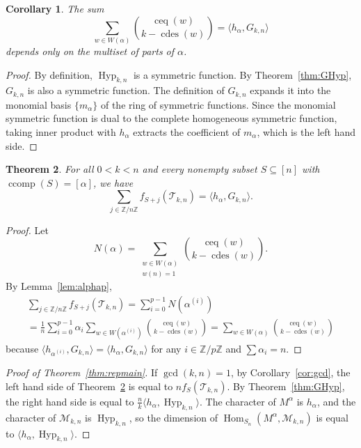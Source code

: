 \documentclass[10pt,a4paper]{amsart}
\theoremstyle{plain}
\newtheorem{theorem}{Theorem}[section]
\newtheorem{corollary}[theorem]{Corollary}
\theoremstyle{definition}
\newcommand{\Z}{\mathbb{Z}}
\newcommand{\Tri}{\mathcal{T}_{k,n}}
\DeclareMathOperator{\ccomp}{ccomp}
\DeclareMathOperator{\Hyp}{Hyp}
\DeclareMathOperator{\Hom}{Hom}
\DeclareMathOperator{\cdes}{cdes}
\DeclareMathOperator{\ceq}{ceq}
\begin{document}
\begin{corollary}\label{cor:Gsym}
	The sum
	\[
		\sum_{w \in W(\alpha)} \binom{\ceq(w)}{k - \cdes(w)} = \langle h_\alpha, G_{k,n} \rangle
	\]
	depends only on the multiset of parts of $ \alpha $.
\end{corollary}
\begin{proof}
	By definition, $\Hyp_{k,n}$ is a symmetric function. By Theorem~\ref{thm:GHyp}, $G_{k,n}$ is also a symmetric function. The definition of $G_{k,n}$ expands it into the monomial basis $\{m_\alpha\}$ of the ring of symmetric functions. Since the monomial symmetric function is dual to the complete homogeneous symmetric function, taking inner product with $h_\alpha$ extracts the coefficient of $m_\alpha$, which is the left hand side.
\end{proof}

\begin{theorem}\label{thm:ftoG}
	For all $ 0 < k < n $
	and every nonempty subset $ S \subseteq [n] $ with $
		\ccomp(S) = [\alpha]$, we have
	\begin{equation}
		\sum_{j \in \Z/n\Z} f_{S+j}(\Tri) = \langle h_\alpha, G_{k,n} \rangle.
	\end{equation}
\end{theorem}
\begin{proof}
	Let
	\[
		N(\alpha) = \sum_{\substack{w \in W(\alpha) \\ w(n) = 1}} \binom{\ceq(w)}{k - \cdes(w)}.
	\]
	By Lemma~\ref{lem:alphap},
	\begin{multline}
		\sum_{j \in \Z/n\Z} f_{S+j}(\Tri)  = \sum_{i=0}^{p-1} N(\alpha^{(i)})
		\\= \frac{1}{n} \sum_{i=0}^{p-1} \alpha_i \sum_{w \in W(\alpha^{(i)})} \binom{\ceq(w)}{k - \cdes(w)} = \sum_{w \in W(\alpha)} \binom{\ceq(w)}{k - \cdes(w)}
	\end{multline}
	because $\langle h_{\alpha^{(i)}}, G_{k,n} \rangle = \langle h_\alpha, G_{k,n} \rangle$ for any $i \in \Z/p\Z$ and $\sum \alpha_i = n$.
\end{proof}

\begin{proof}[Proof of Theorem~\ref{thm:repmain}]
	If $\gcd(k,n) = 1$, by Corollary~\ref{cor:gcd}, the left hand side of Theorem~\ref{thm:ftoG} is equal to $n f_S(\Tri)$. By Theorem~\ref{thm:GHyp}, the right hand side is equal to $\frac{n}{k} \langle h_\alpha, \Hyp_{k,n} \rangle$.
	The character of $M^\alpha$ is $h_\alpha$, and the character of $\mathcal{M}_{k,n}$ is $\Hyp_{k,n}$, so the dimension of $\Hom_{S_n}(M^\alpha, \mathcal{M}_{k,n})$ is equal to $\langle h_\alpha, \Hyp_{k,n} \rangle$.
\end{proof}
\end{document}
